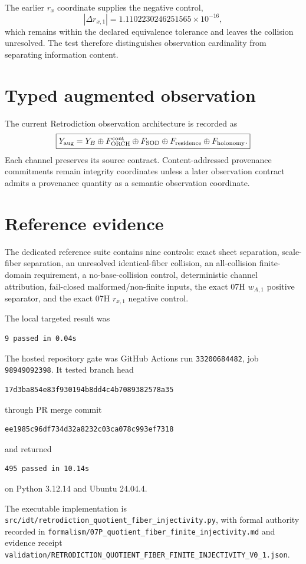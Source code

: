 The earlier $r_x$ coordinate supplies the negative control,
\[
|\Delta r_{x,1}|
=1.1102230246251565\times10^{-16},
\]
which remains within the declared equivalence tolerance and leaves the collision unresolved.  The test therefore distinguishes observation cardinality from separating information content.

\section{Typed augmented observation}

The current Retrodiction observation architecture is recorded as
\[
\boxed{
Y_{\rm aug}
=
Y_B
\oplus F_{\rm ORCH}^{\rm cont}
\oplus F_{\rm SOD}
\oplus F_{\rm residence}
\oplus F_{\rm holonomy}.
}
\]
Each channel preserves its source contract.  Content-addressed provenance commitments remain integrity coordinates unless a later observation contract admits a provenance quantity as a semantic observation coordinate.

\section{Reference evidence}

The dedicated reference suite contains nine controls: exact sheet separation, scale-fiber separation, an unresolved identical-fiber collision, an all-collision finite-domain requirement, a no-base-collision control, deterministic channel attribution, fail-closed malformed/non-finite inputs, the exact 07H $w_{A,1}$ positive separator, and the exact 07H $r_{x,1}$ negative control.

The local targeted result was
\begin{verbatim}
9 passed in 0.04s
\end{verbatim}

The hosted repository gate was GitHub Actions run \texttt{33200684482}, job \texttt{98949092398}.  It tested branch head
\begin{verbatim}
17d3ba854e83f930194b8dd4c4b7089382578a35
\end{verbatim}
through PR merge commit
\begin{verbatim}
ee1985c96df734d32a8232c03ca078c993ef7318
\end{verbatim}
and returned
\begin{verbatim}
495 passed in 10.14s
\end{verbatim}
on Python 3.12.14 and Ubuntu 24.04.4.

The executable implementation is
\texttt{src/idt/retrodiction\_quotient\_fiber\_injectivity.py},
with formal authority recorded in
\texttt{formalism/07P\_quotient\_fiber\_finite\_injectivity.md}
and evidence receipt
\texttt{validation/RETRODICTION\_QUOTIENT\_FIBER\_FINITE\_INJECTIVITY\_V0\_1.json}.

